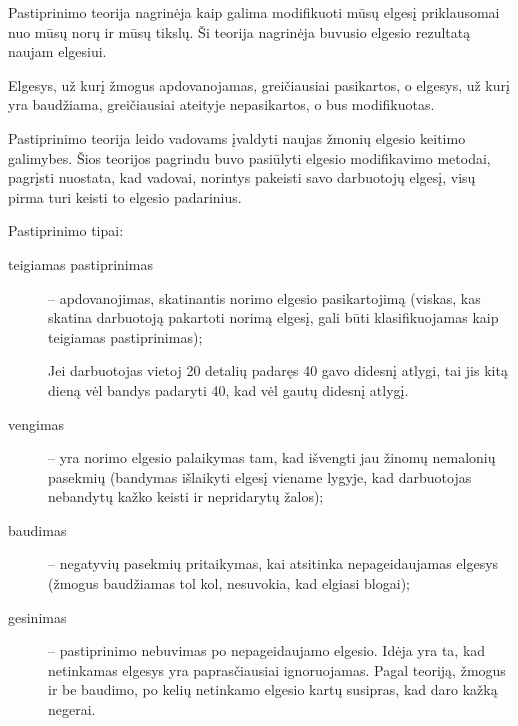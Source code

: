Pastiprinimo teorija nagrinėja kaip galima modifikuoti mūsų elgesį
priklausomai nuo mūsų norų ir mūsų tikslų. Ši teorija nagrinėja
buvusio elgesio rezultatą naujam elgesiui.

Elgesys, už kurį žmogus apdovanojamas, greičiausiai pasikartos, o
elgesys, už kurį yra baudžiama, greičiausiai ateityje nepasikartos,
o bus modifikuotas.

Pastiprinimo teorija leido vadovams įvaldyti naujas žmonių elgesio
keitimo galimybes. Šios teorijos pagrindu buvo pasiūlyti elgesio
modifikavimo metodai, pagrįsti nuostata, kad vadovai, norintys
pakeisti savo darbuotojų elgesį, visų pirma turi keisti to elgesio
padarinius.

Pastiprinimo tipai:
\begin{description}
  \item[teigiamas pastiprinimas] – apdovanojimas, skatinantis norimo
    elgesio pasikartojimą (viskas, kas skatina darbuotoją pakartoti norimą
    elgesį, gali būti klasifikuojamas kaip teigiamas pastiprinimas);
    \begin{exmp}
      Jei darbuotojas vietoj 20 detalių padaręs 40 gavo didesnį atlygi,
      tai jis kitą dieną vėl bandys padaryti 40, kad vėl gautų didesnį
      atlygį.
    \end{exmp}
  \item[vengimas] – yra norimo elgesio palaikymas tam, kad išvengti
    jau žinomų nemalonių pasekmių (bandymas išlaikyti elgesį viename
    lygyje, kad darbuotojas nebandytų kažko keisti ir nepridarytų žalos);
  \item[baudimas] – negatyvių pasekmių pritaikymas, kai atsitinka
    nepageidaujamas elgesys (žmogus baudžiamas tol kol, nesuvokia, kad
    elgiasi blogai);
  \item[gesinimas] – pastiprinimo nebuvimas po nepageidaujamo elgesio.
    Idėja yra ta, kad netinkamas elgesys yra paprasčiausiai ignoruojamas.
    Pagal teoriją, žmogus ir be baudimo, po kelių netinkamo elgesio kartų
    susipras, kad daro kažką negerai.
\end{description}


